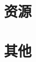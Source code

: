 \documentclass[a4paper,11pt,twoside]{ctexbook}
\begin{document}


\newpage

% 


\newpage
\chapter{资源}

\newpage
\chapter{其他}
\end{document}

